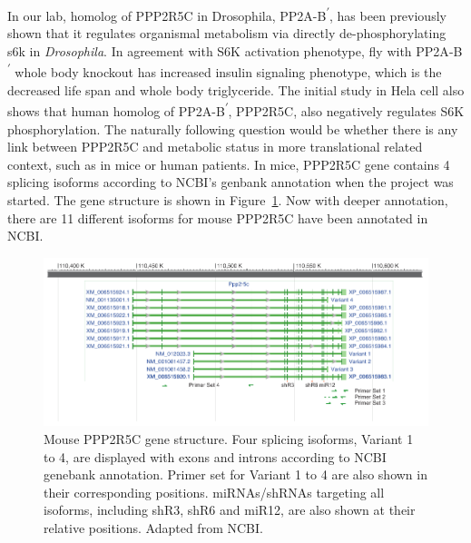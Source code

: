 In our lab, homolog of PPP2R5C in Drosophila, \gls{PP2A}-B\textsuperscript{\ensuremath{\prime}}, has been previously shown that it regulates organismal metabolism \cite{hahn_pp2a_2010} via directly de-phosphorylating \gls{s6k} in \textit{Drosophila}. In agreement with S6K activation phenotype, fly with \gls{PP2A}-B\textsuperscript{\ensuremath{\prime}} whole body knockout has increased insulin signaling phenotype, which is the decreased life span and whole body triglyceride. The initial study in Hela cell also shows that human homolog of \gls{PP2A}-B\textsuperscript{\ensuremath{\prime}}, PPP2R5C, also negatively regulates S6K phosphorylation. The naturally following question would be whether there is any link between PPP2R5C and metabolic status in more translational related context, such as in mice or human patients. In mice, PPP2R5C gene contains 4 splicing isoforms according to NCBI's genbank annotation when the project was started. The gene structure is shown in Figure~\ref{fig:fig2.0}. Now with deeper annotation, there are 11 different isoforms for mouse PPP2R5C have been annotated in NCBI.

\begin{figure}[!tb]
\centering
\includegraphics[width=1\textwidth]{figs/fig2-0 ppp2r5c gene structure.pdf}
\caption[Mouse PPP2R5C gene structure]{\footnotesize Mouse PPP2R5C gene structure. Four splicing isoforms, Variant 1 to 4, are displayed with exons and introns according to NCBI genebank annotation. Primer set for Variant 1 to 4 are also shown in their corresponding positions. miRNAs/shRNAs targeting all isoforms, including shR3, shR6 and miR12, are also shown at their relative positions. Adapted from NCBI.}
\label{fig:fig2.0}
\end{figure}


